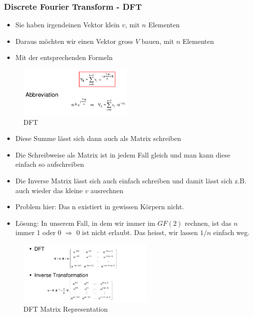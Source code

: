 \hypertarget{discrete-fourier-transform---dft}{%
\subsubsection{Discrete Fourier Transform -
DFT}\label{discrete-fourier-transform---dft}}

\begin{itemize}
\tightlist
\item
  Sie haben irgendeinen Vektor klein $v$, mit $n$ Elementen
\item
  Daraus möchten wir einen Vektor gross $V$ bauen, mit $n$ Elementen
\item
  Mit der entsprechenden Formeln
\end{itemize}

\begin{figure}[H]
\centering
\includegraphics[width=0.5\textwidth]{figures/dft.png}
\caption{DFT}
\end{figure}

\begin{itemize}
\tightlist
\item
  Diese Summe lässt sich dann auch als Matrix schreiben
\item
  Die Schreibweise als Matrix ist in jedem Fall gleich und man kann
  diese einfach so aufschreiben
\item
  Die Inverse Matrix lässt sich auch einfach schreiben und damit lässt
  sich z.B. auch wieder das kleine $v$ ausrechnen
\item
  Problem hier: Das n existiert in gewissen Körpern nicht.
\item
  Lösung: In unserem Fall, in dem wir immer im $GF(2)$ rechnen, ist das $n$
  immer 1 oder 0 $\Rightarrow$ 0 ist nicht erlaubt. Das heisst, wir lassen $1/n$ einfach weg.
\end{itemize}

\begin{figure}[H]
\centering
\includegraphics[width=0.6\textwidth]{figures/dftMatrixRepresentation.png}
\caption{DFT Matrix Representation}
\end{figure}

